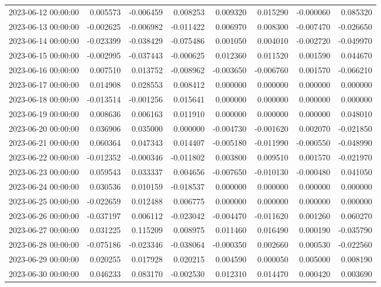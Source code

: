 \begin{tabular}{lrrrrrrr}
2023-06-12 00:00:00 & 0.005573 & -0.006459 & 0.008253 & 0.009320 & 0.015290 & -0.000060 & 0.085320 \\
2023-06-13 00:00:00 & -0.002625 & -0.006982 & -0.011422 & 0.006970 & 0.008300 & -0.007470 & -0.026650 \\
2023-06-14 00:00:00 & -0.023399 & -0.038429 & -0.075486 & 0.001050 & 0.004010 & -0.002720 & -0.049970 \\
2023-06-15 00:00:00 & -0.002995 & -0.037443 & -0.000625 & 0.012360 & 0.011520 & 0.001590 & 0.044670 \\
2023-06-16 00:00:00 & 0.007510 & 0.013752 & -0.008962 & -0.003650 & -0.006760 & 0.001570 & -0.066210 \\
2023-06-17 00:00:00 & 0.014908 & 0.028553 & 0.008412 & 0.000000 & 0.000000 & 0.000000 & 0.000000 \\
2023-06-18 00:00:00 & -0.013514 & -0.001256 & 0.015641 & 0.000000 & 0.000000 & 0.000000 & 0.000000 \\
2023-06-19 00:00:00 & 0.008636 & 0.006163 & 0.011910 & 0.000000 & 0.000000 & 0.000000 & 0.048010 \\
2023-06-20 00:00:00 & 0.036906 & 0.035000 & 0.000000 & -0.004730 & -0.001620 & 0.002070 & -0.021850 \\
2023-06-21 00:00:00 & 0.060364 & 0.047343 & 0.014407 & -0.005180 & -0.011990 & -0.000550 & -0.048990 \\
2023-06-22 00:00:00 & -0.012352 & -0.000346 & -0.011802 & 0.003800 & 0.009510 & 0.001570 & -0.021970 \\
2023-06-23 00:00:00 & 0.059543 & 0.033337 & 0.004656 & -0.007650 & -0.010130 & -0.000480 & 0.041050 \\
2023-06-24 00:00:00 & 0.030536 & 0.010159 & -0.018537 & 0.000000 & 0.000000 & 0.000000 & 0.000000 \\
2023-06-25 00:00:00 & -0.022659 & 0.012488 & 0.006775 & 0.000000 & 0.000000 & 0.000000 & 0.000000 \\
2023-06-26 00:00:00 & -0.037197 & 0.006112 & -0.023042 & -0.004470 & -0.011620 & 0.001260 & 0.060270 \\
2023-06-27 00:00:00 & 0.031225 & 0.115209 & 0.008975 & 0.011460 & 0.016490 & 0.000190 & -0.035790 \\
2023-06-28 00:00:00 & -0.075186 & -0.023346 & -0.038064 & -0.000350 & 0.002660 & 0.000530 & -0.022560 \\
2023-06-29 00:00:00 & 0.020255 & 0.017928 & 0.020215 & 0.004590 & 0.000050 & 0.005000 & 0.008190 \\
2023-06-30 00:00:00 & 0.046233 & 0.083170 & -0.002530 & 0.012310 & 0.014470 & 0.000420 & 0.003690 \\

\end{tabular}
